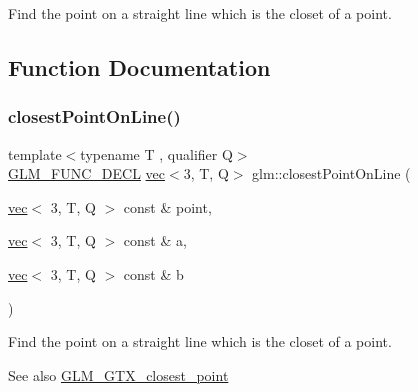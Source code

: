 Find the point on a straight line which is the closet of a point. 

\subsection{Function Documentation}
\mbox{\label{group__gtx__closest__point_ga36529c278ef716986151d58d151d697d}} 
\subsubsection{\texorpdfstring{closest\+Point\+On\+Line()}{closestPointOnLine()}\hspace{0.1cm}{\footnotesize\ttfamily [1/2]}}
{\footnotesize\ttfamily template$<$typename T , qualifier Q$>$ \\
\hyperlink{setup_8hpp_ab2d052de21a70539923e9bcbf6e83a51}{G\+L\+M\+\_\+\+F\+U\+N\+C\+\_\+\+D\+E\+CL} \hyperlink{structglm_1_1vec}{vec}$<$3, T, Q$>$ glm\+::closest\+Point\+On\+Line (\begin{DoxyParamCaption}\item[{\hyperlink{structglm_1_1vec}{vec}$<$ 3, T, Q $>$ const \&}]{point,  }\item[{\hyperlink{structglm_1_1vec}{vec}$<$ 3, T, Q $>$ const \&}]{a,  }\item[{\hyperlink{structglm_1_1vec}{vec}$<$ 3, T, Q $>$ const \&}]{b }\end{DoxyParamCaption})}

Find the point on a straight line which is the closet of a point. \begin{DoxySeeAlso}{See also}
\hyperlink{group__gtx__closest__point}{G\+L\+M\+\_\+\+G\+T\+X\+\_\+closest\+\_\+point} 
\end{DoxySeeAlso}
\mbox{\label{group__gtx__closest__point_ga55bcbcc5fc06cb7ff7bc7a6e0e155eb0}} 
